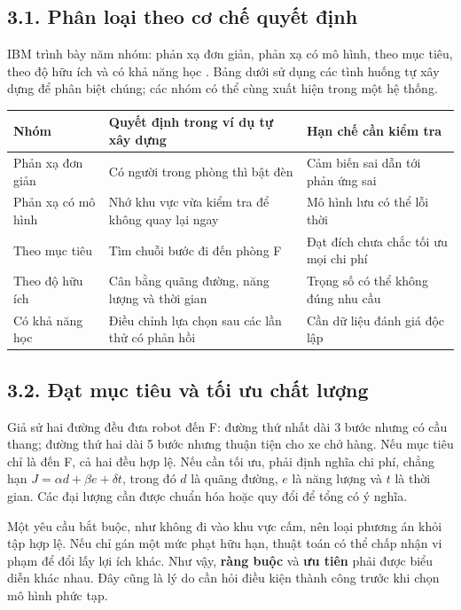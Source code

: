\documentclass[11pt,a4paper]{article}
\begin{document}
\subsection{3.1. Phân loại theo cơ chế quyết định}
IBM trình bày năm nhóm: phản xạ đơn giản, phản xạ có mô hình, theo mục tiêu,
theo độ hữu ích và có khả năng học \cite{ibm}. Bảng dưới sử dụng các tình huống
tự xây dựng để phân biệt chúng; các nhóm có thể cùng xuất hiện trong một hệ thống.

\begin{center}\small
\begin{tabularx}{\linewidth}{@{}p{2.8cm}XX@{}}
\toprule
\textbf{Nhóm} & \textbf{Quyết định trong ví dụ tự xây dựng} & \textbf{Hạn chế cần kiểm tra}\\
\midrule
Phản xạ đơn giản & Có người trong phòng thì bật đèn & Cảm biến sai dẫn tới phản ứng sai\\
Phản xạ có mô hình & Nhớ khu vực vừa kiểm tra để không quay lại ngay & Mô hình lưu có thể lỗi thời\\
Theo mục tiêu & Tìm chuỗi bước đi đến phòng F & Đạt đích chưa chắc tối ưu mọi chi phí\\
Theo độ hữu ích & Cân bằng quãng đường, năng lượng và thời gian & Trọng số có thể không đúng nhu cầu\\
Có khả năng học & Điều chỉnh lựa chọn sau các lần thử có phản hồi & Cần dữ liệu đánh giá độc lập\\
\bottomrule
\end{tabularx}
\end{center}

\subsection{3.2. Đạt mục tiêu và tối ưu chất lượng}
Giả sử hai đường đều đưa robot đến F: đường thứ nhất dài 3 bước nhưng có cầu thang;
đường thứ hai dài 5 bước nhưng thuận tiện cho xe chở hàng. Nếu mục tiêu chỉ là đến F,
cả hai đều hợp lệ. Nếu cần tối ưu, phải định nghĩa chi phí, chẳng hạn
$J=\alpha d+\beta e+\delta t$, trong đó $d$ là quãng đường, $e$ là năng lượng và $t$
là thời gian. Các đại lượng cần được chuẩn hóa hoặc quy đổi để tổng có ý nghĩa.

Một yêu cầu bắt buộc, như không đi vào khu vực cấm, nên loại phương án khỏi tập hợp lệ.
Nếu chỉ gán một mức phạt hữu hạn, thuật toán có thể chấp nhận vi phạm để đổi lấy lợi ích
khác. Như vậy, \textbf{ràng buộc} và \textbf{ưu tiên} phải được biểu diễn khác nhau.
Đây cũng là lý do cần hỏi điều kiện thành công trước khi chọn mô hình phức tạp.
\end{document}
